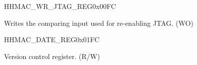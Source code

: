 \begin{register}{H}{HMAC\_WR\_JTAG\_REG}{0x00FC}\label{regdesc:HMACWRJTAGREG}
%
\regnewline%
\begin{regdesc}\begin{reglist}
\label{fielddesc:HMACWRJTAG}\item [HMAC\_WR\_JTAG] Writes the comparing input used for re-enabling JTAG. (WO)
\end{reglist}\end{regdesc}
\end{register}


\begin{register}{H}{HMAC\_DATE\_REG}{0x01FC}\label{regdesc:HMACDATEREG}
%
%
\regnewline%
\begin{regdesc}\begin{reglist}
\label{fielddesc:HMACDATE}\item [HMAC\_DATE] Version control register. (R/W)
\end{reglist}\end{regdesc}
\end{register}
